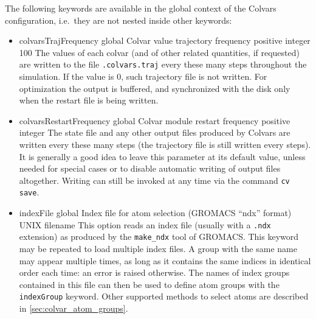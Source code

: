 
The following keywords are available in the global context of the Colvars configuration, i.e.~they are not nested inside other keywords:
\begin{itemize}

\item %
  \keydef
    {colvarsTrajFrequency}{%
    global}{%
  Colvar value trajectory frequency}{%
    positive integer}{%
    100}{%
    The values of each colvar (and of other related quantities, if requested) are written to the file \outputName\texttt{.colvars.traj} every these many steps throughout the simulation.
    If the value is 0, such trajectory file is not written.
    For optimization the output is buffered, and synchronized with the disk only when the restart file is being written.}

\item %
  \keydef
    {colvarsRestartFrequency}{%
    global}{%
    Colvar module restart frequency}{%
    positive integer}{%
    }{%
    The state file and any other output files produced by Colvars are written every these many steps (the trajectory file is still written every  steps).
    It is generally a good idea to leave this parameter at its default value, unless needed for special cases or to disable automatic writing of output files altogether.
    Writing can still be invoked at any time via the command \texttt{cv save}.}

\item %
  \key
    {indexFile}{%
    global}{%
    Index file for atom selection (GROMACS ``ndx'' format)}{%
    UNIX filename}{%
    This option reads an index file (usually with a \texttt{.ndx}
    extension) as produced by the \texttt{make\_ndx} tool of GROMACS.
    This keyword may be repeated to load multiple index files.
    A group with the same name may appear multiple times, as long as it contains the same indices in identical order each time: an error is raised otherwise.
    The names of index groups contained in this file can then be used to define
    atom groups with the \texttt{indexGroup} keyword.
    Other supported methods to select atoms are described in \ref{sec:colvar_atom_groups}.
  }


\end{itemize}
